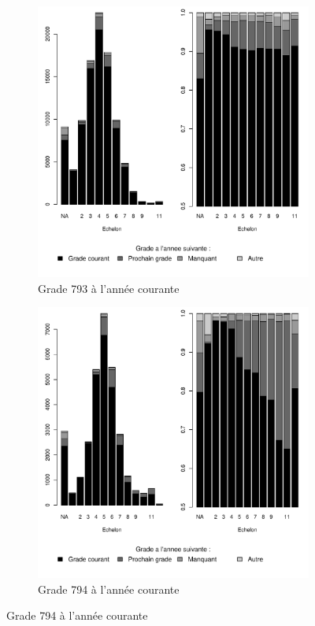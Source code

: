 \documentclass[11pt,a4paper]{article}
\begin{document}
\begin{figure}[ht] 
  \caption{Situation d'une année à l'autre, selon l'échelon}
  \label{evo_by_ech} 
  \begin{subfigure}[b]{0.5\linewidth}
      \caption{Grade 793 à l'année courante}
    \label{evo_by_ech_791} 
    \centering
    \includegraphics[width=1\linewidth]{AA_hazard_by_ech_791.pdf} 
  \end{subfigure}
  \begin{subfigure}[b]{0.5\linewidth}
        \caption{Grade 794 à l'année courante} 
    \label{evo_by_ech_792} 
    \centering
    \includegraphics[width=1\linewidth]{AA_hazard_by_ech_792.pdf} 
  \end{subfigure} 
\end{figure}
\end{document}

